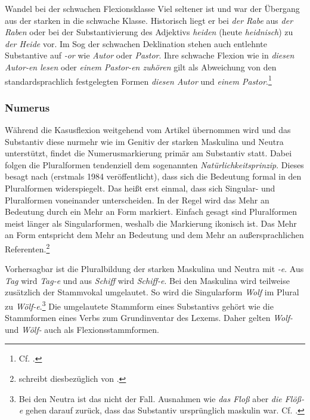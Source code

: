\begin{Exkurs}{Wandel bei der schwachen Flexionsklasse}
Viel seltener ist und war der Übergang aus der starken in die schwache Klasse. Historisch liegt er bei \textit{der Rabe} aus \textit{der Raben} oder bei der Substantivierung des Adjektivs \textit{heiden} (heute \textit{heidnisch}) zu \textit{der Heide} vor. Im Sog der schwachen Deklination stehen auch entlehnte Substantive auf \textit{-or} wie \textit{Autor} oder \textit{Pastor}. Ihre schwache Flexion wie in \textit{diesen Autor-en lesen} oder \textit{einem Pastor-en zuhören} gilt als Abweichung von den standardsprachlich festgelegten Formen \textit{diesen Autor} und \textit{einem Pastor}.\footnote{Cf. \citet[717, §1246]{Duden2022}.}

\end{Exkurs}

\subsubsection{Numerus}\label{subsubsection:Numerus}

Während die Kasusflexion weitgehend vom Artikel übernommen wird und das Substantiv diese nurmehr wie im Genitiv der starken Maskulina und Neutra unterstützt, findet die Numerusmarkierung primär am Substantiv statt. Dabei folgen die Pluralformen tendenziell dem sogenannten \textit{Natürlichkeitsprinzip}. Dieses besagt nach \citet[23, 175]{Wurzel1984_2001} (erstmals 1984 veröffentlicht), dass sich die Bedeutung  formal in den Pluralformen widerspiegelt. Das heißt erst einmal, dass sich Singular- und Pluralformen voneinander unterscheiden. In der Regel wird das Mehr an Bedeutung durch ein Mehr an Form markiert. Einfach gesagt sind Pluralformen meist länger als Singularformen, weshalb die Markierung ikonisch ist. Das Mehr an Form entspricht dem Mehr an Bedeutung und dem Mehr an außersprachlichen Referenten.\footnote{\citet[23--25]{Mayerthaler1981} schreibt diesbezüglich von .}

Vorhersagbar ist die Pluralbildung der starken Maskulina und Neutra mit \textit{-e}. Aus \textit{Tag} wird \textit{Tag-e} und aus \textit{Schiff} wird \textit{Schiff-e}. Bei den Maskulina wird teilweise zusätzlich der Stammvokal umgelautet. So wird die Singularform \textit{Wolf} im Plural zu \textit{Wölf-e}.\footnote{Bei den Neutra ist das nicht der Fall. Ausnahmen wie \textit{das Floß} aber \textit{die Flöß-e} gehen darauf zurück, dass das Substantiv ursprünglich maskulin war. Cf. \citet[18]{Paul1986_1917_Fx}.} Die umgelautete Stammform eines Substantivs gehört wie die Stammformen eines Verbs zum Grundinventar des Lexems. Daher gelten \textit{Wolf-} und \textit{Wölf-} auch als Flexionsstammformen.

